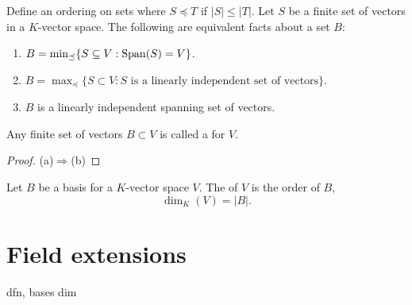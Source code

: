 \documentclass{ximera}
\begin{document}
\begin{theorem}
  Define an ordering on sets where $S \preceq T$ if $|S|\le |T|$. Let
  $S$ be a finite set of vectors in a $K$-vector space. The following
  are equivalent facts about a set $B$:
  \begin{enumerate}
  \item $B = \min_{\preceq}\{S\subseteq V:\operatorname{Span}(S) = V\}$.
  \item $B = \max_{\preceq}\{S\subset V:\text{$S$ is a linearly independent set of vectors}\}$.
  \item $B$ is a linearly independent spanning set of vectors.
  \end{enumerate}
  Any finite set of vectors $B \subset V$ is called a  for
  $V$.
  \begin{proof}
    (a)$\Rightarrow$(b)
  \end{proof}
\end{theorem}

\begin{definition}
  Let $B$ be a basis for a $K$-vector space $V$. The  of $V$ is the order of $B$,
  \[
  \dim_K(V) = |B|.
  \]
\end{definition}






\section{Field extensions}






dfn, bases dim
\end{document}
